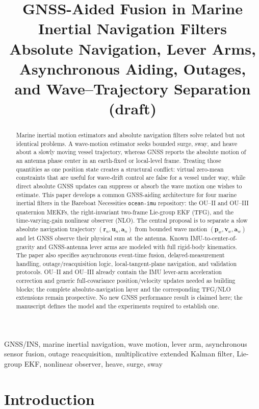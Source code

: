 \documentclass[conference]{IEEEtran}
\title{GNSS-Aided Fusion in Marine Inertial Navigation Filters\\
\large Absolute Navigation, Lever Arms, Asynchronous Aiding, Outages, and Wave--Trajectory Separation (draft)}
\author{%
\IEEEauthorblockN{Mikhail S. Grushinskiy}
\IEEEauthorblockA{Independent Researcher, USA, Fair Lawn\\
Bareboat Necessities GitHub Project\\
Email: mgrouch@users.github.com}%
}
\DeclareRobustCommand{\vct}[1]{\bm{#1}}
\begin{document}
\maketitle

\begin{abstract}
Marine inertial motion estimators and absolute navigation filters solve related but
not identical problems.  A wave-motion estimator seeks bounded surge, sway, and
heave about a slowly moving vessel trajectory, whereas GNSS reports the absolute
motion of an antenna phase center in an earth-fixed or local-level frame.  Treating
those quantities as one position state creates a structural conflict: virtual
zero-mean constraints that are useful for wave-drift control are false for a vessel
under way, while direct absolute GNSS updates can suppress or absorb the wave motion
one wishes to estimate.  This paper develops a common GNSS-aiding architecture for
four marine inertial filters in the Bareboat Necessities \texttt{ocean-imu}
repository: the OU--II and OU--III quaternion MEKFs, the right-invariant two-frame
Lie-group EKF (TFG), and the time-varying-gain nonlinear observer (NLO).  The central
proposal is to separate a slow absolute navigation trajectory
$(\vct r_n,\vct u_n,\vct a_n)$ from bounded wave motion
$(\vct p_w,\vct v_w,\vct a_w)$ and let GNSS observe their physical sum at the
antenna.  Known IMU-to-center-of-gravity and GNSS-antenna lever arms are modeled with
full rigid-body kinematics.  The paper also specifies asynchronous event-time fusion,
delayed-measurement handling, outage/reacquisition logic, local-tangent-plane
navigation, and validation protocols.  OU--II and OU--III already contain the IMU
lever-arm acceleration correction and generic full-covariance position/velocity
updates needed as building blocks; the complete absolute-navigation layer and the
corresponding TFG/NLO extensions remain prospective.  No new GNSS performance result
is claimed here; the manuscript defines the model and the experiments required to
establish one.
\end{abstract}

\begin{IEEEkeywords}
GNSS/INS, marine inertial navigation, wave motion, lever arm, asynchronous sensor
fusion, outage reacquisition, multiplicative extended Kalman filter, Lie-group EKF,
nonlinear observer, heave, surge, sway
\end{IEEEkeywords}

\section{Introduction}
\label{sec:introduction}
\end{document}
